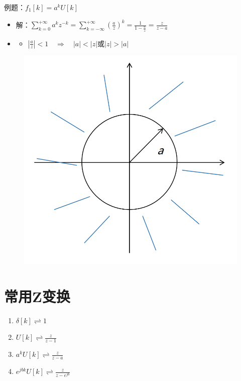 \documentclass[UTF8]{ctexart}
\begin{document}
例题：$f_1[k]=a^kU[k]$ \par
\begin{itemize}[label=,left=2.5em]
  \item 解：$\sum_{k=0}^{+\infty}a^kz^{-k}=\sum_{k=-\infty}^{+\infty}(\frac{a}{z})^k=\frac{1}{1-\frac{a}{z}}=\frac{z}{z-a}$
  \item \begin{itemize}[label=,left=1.5em]
          \item $|\frac{a}{z}|<1\quad\Longrightarrow \quad|a|<|z|$或$|z|>|a|$
        \end{itemize}
\end{itemize}
\begin{figure}[h]
  \centering
  \includegraphics[scale=0.28]{例题收敛域.png}
\end{figure}

\newpage
\section{常用Z变换}
\begin{enumerate}[label=(\arabic*),itemindent=0pt,labelindent=\parindent,labelwidth=2em,labelsep=5pt,leftmargin=*]
  \item $\delta[k]\rightleftharpoons 1$
  \item $U[k]\rightleftharpoons \frac{z}{z-1}$
  \item $a^kU[k]\rightleftharpoons \frac{z}{z-a}$
  \item $e^{jbk}U[k]\rightleftharpoons \frac{z}{z-e^{jb}}$
\end{enumerate}\par
\end{document}
